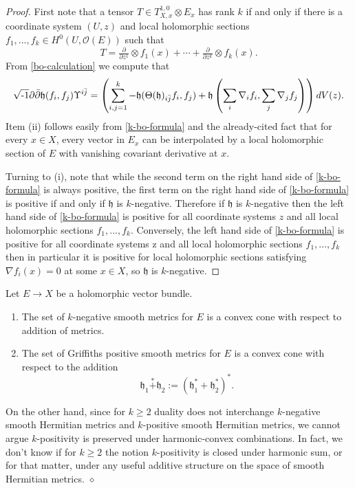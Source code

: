 \documentclass[12pt,hidelinks]{amsart}
\newcommand{\cO}{{\mathcal O}}
\newcommand{\fh}{{\mathfrak h}}
\newcommand{\red}{\hfill $\diamond$}
\newcommand{\di}{\partial}
\newcommand{\dbar}{\bar \partial}
\newcommand{\ii}{\sqrt{\text{\rm -}1}}
\newcommand{\tensor}{\otimes}
\begin{document}
\begin{proof}
First note that a tensor $T \in T^{1,0}_{X,x} \tensor E_x$ has rank $k$ if and only if there is a coordinate system $(U,z)$ and local holomorphic sections $f_1,...,f_k \in H^0(U, \cO(E))$ such that 
\[
T = \tfrac{\di}{\di z^1} \tensor f_1(x)+ \cdots + \tfrac{\di}{\di z^k} \tensor f_k(x).
\]
From \eqref{bo-calculation} we compute that 
\begin{equation}\label{k-bo-formula}
\ii \di \dbar \fh (f_i, f_j) \Upsilon ^{i \bar j} =\left ( \sum _{i ,j=1} ^k- \fh (\Theta (\fh) _{i \bar j} f_i , f_j) + \fh \left ( \sum _i \nabla _i f_i , \sum _j \nabla _j f_j \right )\right ) dV(z).
\end{equation}
Item (ii) follows easily from \eqref{k-bo-formula} and the already-cited fact that for every $x \in X$, every vector in $E_x$ can be interpolated by a local holomorphic section of $E$ with vanishing covariant derivative at $x$.  

Turning to (i), note that while the second term on the right hand side of \eqref{k-bo-formula} is always positive, the first term on the right hand side of \eqref{k-bo-formula} is positive if and only if $\fh$ is $k$-negative.  Therefore if $\fh$ is $k$-negative then the left hand side of \eqref{k-bo-formula} is positive for all coordinate systems $z$ and all local holomorphic sections $f_1,..., f_k$.  Conversely, the left hand side of \eqref{k-bo-formula} is positive for all coordinate systems z and all local holomorphic sections $f_1,..., f_k$ then in particular it is positive for local holomorphic sections satisfying $\nabla f_i (x) = 0$ at some $x \in X$, so $\fh$ is $k$-negative.
\end{proof}

\begin{cor}\label{cone-observation}
Let $E \to X$ be a holomorphic vector bundle.
\begin{enumerate}[{\rm a.}]
\item The set of $k$-negative smooth metrics for $E$ is a convex cone with respect to addition of metrics.
\item The set of Griffiths positive smooth metrics for $E$ is a convex cone with respect to the addition
\[
\fh _1 \stackrel{*}{+} \fh _2 := \left ( \fh _1 ^* + \fh _2 ^* \right )^*.
\]
\end{enumerate}
\end{cor}

\begin{rmk}\label{no-cone-yo!}
On the other hand, since for $k \ge 2$ duality does not interchange $k$-negative smooth Hermitian metrics and $k$-positive smooth Hermitian metrics, we cannot argue $k$-positivity is preserved under harmonic-convex combinations.  In fact, we don't know if for $k \ge 2$ the notion $k$-positivity is closed under harmonic sum, or for that matter, under any useful additive structure on the space of smooth Hermitian metrics.
\red
\end{rmk}
\end{document}
